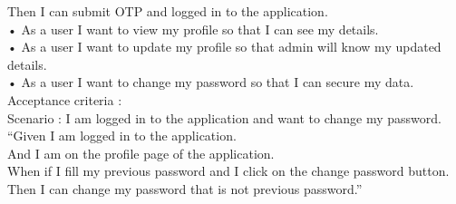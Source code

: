 \documentclass[conference]{IEEEtran}
\begin{document}
Then I can submit OTP and logged in to the application.\\
• As a user I want to view my profile so that I can see my details.\\
• As a user I want to update my profile so that admin will know my updated details.\\
• As a user I want to change my password so that I can secure my data.\\
 Acceptance criteria :\\
 Scenario : I am logged in to the application and want to change my 
password.\\
“Given I am logged in to the application.\\
And I am on the profile page of the application.\\
When if I fill my previous password and I click on the change password 
button.\\
Then I can change my password that is not previous password.”\\
\end{document}
